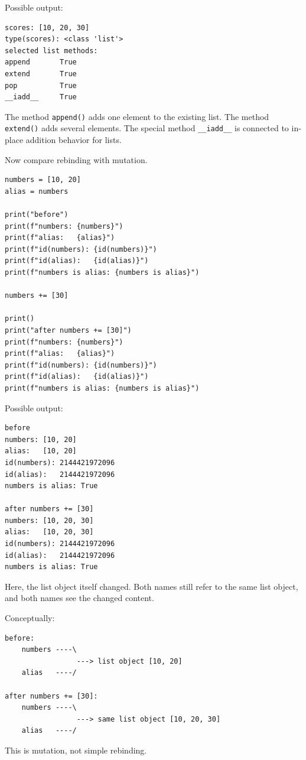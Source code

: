 Possible output:

\begin{verbatim}
scores: [10, 20, 30]
type(scores): <class 'list'>
selected list methods:
append       True
extend       True
pop          True
__iadd__     True
\end{verbatim}

The method \texttt{append()} adds one element to the existing list. The method \texttt{extend()} adds several elements. The special method \texttt{\_\_iadd\_\_} is connected to in-place addition behavior for lists.

Now compare rebinding with mutation.

\begin{verbatim}
numbers = [10, 20]
alias = numbers

print("before")
print(f"numbers: {numbers}")
print(f"alias:   {alias}")
print(f"id(numbers): {id(numbers)}")
print(f"id(alias):   {id(alias)}")
print(f"numbers is alias: {numbers is alias}")

numbers += [30]

print()
print("after numbers += [30]")
print(f"numbers: {numbers}")
print(f"alias:   {alias}")
print(f"id(numbers): {id(numbers)}")
print(f"id(alias):   {id(alias)}")
print(f"numbers is alias: {numbers is alias}")
\end{verbatim}

Possible output:

\begin{verbatim}
before
numbers: [10, 20]
alias:   [10, 20]
id(numbers): 2144421972096
id(alias):   2144421972096
numbers is alias: True

after numbers += [30]
numbers: [10, 20, 30]
alias:   [10, 20, 30]
id(numbers): 2144421972096
id(alias):   2144421972096
numbers is alias: True
\end{verbatim}

Here, the list object itself changed. Both names still refer to the same list object, and both names see the changed content.

Conceptually:

\begin{verbatim}
before:
    numbers ----\
                 ---> list object [10, 20]
    alias   ----/

after numbers += [30]:
    numbers ----\
                 ---> same list object [10, 20, 30]
    alias   ----/
\end{verbatim}

This is mutation, not simple rebinding.

